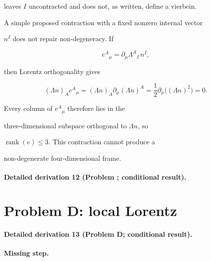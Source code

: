 leaves \(I\) uncontracted and does not, as written, define a vierbein.



A simple proposed contraction with a fixed nonzero internal vector

\(n^I\) does not repair non-degeneracy. If

\[

e^A{}_\mu=\partial_\mu\Lambda^A{}_I\,n^I,

\]

then Lorentz orthogonality gives

\[

(\Lambda n)_A e^A{}_\mu

=

(\Lambda n)_A\partial_\mu(\Lambda n)^A

=

\frac12\partial_\mu\bigl((\Lambda n)^2\bigr)

=0.

\]

Every column of \(e^A{}_\mu\) therefore lies in the

three-dimensional subspace orthogonal to \(\Lambda n\), so

\(\operatorname{rank}(e)\leq 3\). This contraction cannot produce a

non-degenerate four-dimensional frame.



\paragraph{Detailed derivation 12 (Problem ; conditional result).} \label{ref:detail-11} %



\section{Problem D: local Lorentz}

\label{sec:status-D}



\paragraph{Detailed derivation 13 (Problem D; conditional result).} \label{ref:detail-12} %



\paragraph{Missing step.}

